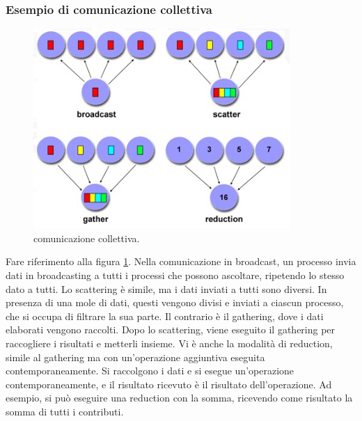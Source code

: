 \subsubsection*{Esempio di comunicazione collettiva}
\begin{figure}[th]
	\centering
	\includegraphics[width=0.7\linewidth]{img/comunicazione-collettiva}
	\caption{comunicazione collettiva.}
	\label{fig:comunicazione-collettiva}
\end{figure}

Fare riferimento alla figura \ref{fig:comunicazione-collettiva}. Nella comunicazione in broadcast, un processo invia dati in broadcasting a tutti i processi che possono ascoltare, ripetendo lo stesso dato a tutti. Lo scattering è simile, ma i dati inviati a tutti sono diversi. In presenza di una mole di dati, questi vengono divisi e inviati a ciascun processo, che si occupa di filtrare la sua parte. Il contrario è il gathering, dove i dati elaborati vengono raccolti. Dopo lo scattering, viene eseguito il gathering per raccogliere i risultati e metterli insieme. Vi è anche la modalità di reduction, simile al gathering ma con un'operazione aggiuntiva eseguita contemporaneamente. Si raccolgono i dati e si esegue un'operazione contemporaneamente, e il risultato ricevuto è il risultato dell'operazione. Ad esempio, si può eseguire una reduction con la somma, ricevendo come risultato la somma di tutti i contributi.

